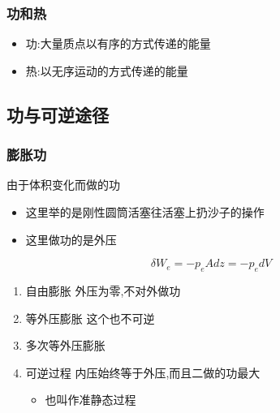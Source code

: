 \documentclass[11pt]{article}
\begin{document}
\subsubsection{功和热}
\label{sec:orgeb7b267}
\begin{itemize}
\item 功:大量质点以有序的方式传递的能量
\item 热:以无序运动的方式传递的能量
\end{itemize}
\subsection{功与可逆途径}
\label{sec:orgf6ac790}
\subsubsection{膨胀功}
\label{sec:orgbe9873c}
由于体积变化而做的功
\begin{itemize}
\item 这里举的是刚性圆筒活塞往活塞上扔沙子的操作
\item 这里做功的是外压
\end{itemize}
\[
\delta W_e =-p_eAdz=-p_edV
\]
\begin{enumerate}
\item 自由膨胀
\label{sec:orge1cac0a}
外压为零,不对外做功
\item 等外压膨胀
\label{sec:orgc7f3c52}
这个也不可逆
\item 多次等外压膨胀
\label{sec:org6e5beb6}
\item 可逆过程
\label{sec:org7a09ac8}
内压始终等于外压,而且二做的功最大
\begin{itemize}
\item 也叫作准静态过程
\end{itemize}
\end{enumerate}
\end{document}
